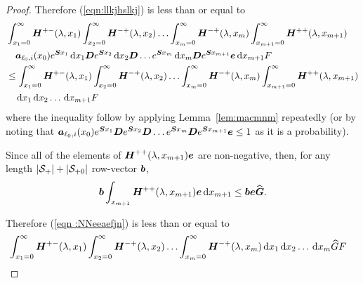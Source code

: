 \begin{proof}
    Therefore (\ref{eqn:llkjhslkj}) is less than or equal to 
	\begin{align}
		&\int_{x_1=0}^\infty \boldsymbol H^{+-}(\lambda,x_1)\nonumber
		\int_{x_2=0}^\infty \boldsymbol H^{-+}(\lambda,x_2) 
		\hdots \int_{x_m=0}^\infty \boldsymbol H^{-+}(\lambda, x_m) 
		\int_{x_{m+1}=0}^\infty \boldsymbol H^{++}(\lambda,x_{m+1}) 
		\\&\quad\boldsymbol   a_{\ell_0,i}(x_0)e^{\boldsymbol{S}x_1}\, \mathrm{d} x_1 \boldsymbol{D}e^{\boldsymbol{S}x_2} \, \mathrm{d} x_2 \boldsymbol{D}\dots e^{\boldsymbol{S}x_m} \, \mathrm{d} x_m \boldsymbol{D}e^{\boldsymbol{S}x_{m+1}}{\boldsymbol e} \, \mathrm{d} x_{m+1} F\nonumber 
		\\&\leq\int_{x_1=0}^\infty \boldsymbol H^{+-}(\lambda,x_1)\nonumber
		\int_{x_2=0}^\infty \boldsymbol H^{-+}(\lambda,x_2) 
		\hdots \int_{x_m=0}^\infty \boldsymbol H^{-+}(\lambda, x_m) 
		\int_{x_{m+1}=0}^\infty \boldsymbol H^{++}(\lambda,x_{m+1}) 
		\\&\quad\, \mathrm{d} x_1  \, \mathrm{d} x_2 \dots \, \mathrm{d} x_{m+1}  F \label{eqn :NNeeaefjn}
	\end{align}
	where the inequality follow by applying Lemma~\ref{lem:macmnm} repeatedly (or by noting that \(\boldsymbol a_{\ell_0,i}(x_0)e^{\boldsymbol{S}x_1} \boldsymbol{D}e^{\boldsymbol{S}x_2} \boldsymbol{D}\dots e^{\boldsymbol{S}x_m} \boldsymbol{D}e^{\boldsymbol{S}x_{m+1}}{\boldsymbol e}\leq 1\) as it is a probability).
	        
	Since all of the elements of \(\boldsymbol H^{++}(\lambda,x_{m+1}) \boldsymbol e\) are non-negative, then, for any length \(|\mathcal{S}_+|+|\mathcal{S}_{+0}|\) row-vector \(\boldsymbol b\), 
	\[\boldsymbol b\int_{x_{m+1}} \boldsymbol H^{++}(\lambda,x_{m+1}) \boldsymbol e \, \mathrm{d} x_{m+1} \leq \boldsymbol b \boldsymbol e \widehat{\boldsymbol G}.\]

	Therefore (\ref{eqn :NNeeaefjn}) is less than or equal to 
	\begin{align}
		&\int_{x_1=0}^\infty \boldsymbol H^{+-}(\lambda,x_1)
		\int_{x_2=0}^\infty \boldsymbol H^{-+}(\lambda,x_2) 
		\hdots \int_{x_m=0}^\infty \boldsymbol H^{-+}(\lambda, x_m) 
		\, \mathrm{d} x_1  \, \mathrm{d} x_2 \dots \, \mathrm{d} x_{m} \widehat{G} F \label{eqn :NNeeaefjn12}
	\end{align}


\end{proof}
